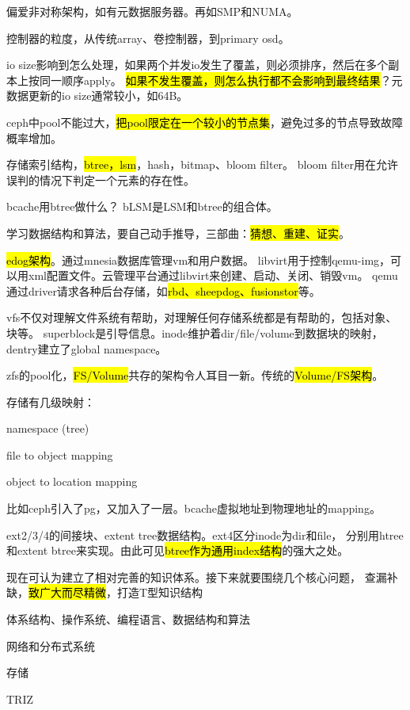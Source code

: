 偏爱非对称架构，如有元数据服务器。再如SMP和NUMA。

控制器的粒度，从传统array、卷控制器，到primary osd。

io size影响到怎么处理，如果两个并发io发生了覆盖，则必须排序，然后在多个副本上按同一顺序apply。
\hl{如果不发生覆盖，则怎么执行都不会影响到最终结果}？元数据更新的io size通常较小，如64B。

ceph中pool不能过大，\hl{把pool限定在一个较小的节点集}，避免过多的节点导致故障概率增加。

存储索引结构，\hl{btree，lsm}，hash，bitmap、bloom filter。
bloom filter用在允许误判的情况下判定一个元素的存在性。

bcache用btree做什么？
bLSM是LSM和btree的组合体。

学习数据结构和算法，要自己动手推导，三部曲：\hl{猜想、重建、证实}。

\hrulefill

\hl{edog架构}。通过mnesia数据库管理vm和用户数据。
libvirt用于控制qemu-img，可以用xml配置文件。云管理平台通过libvirt来创建、启动、关闭、销毁vm。
qemu通过driver请求各种后台存储，如\hl{rbd、sheepdog、fusionstor}等。

\hrulefill

vfs不仅对理解文件系统有帮助，对理解任何存储系统都是有帮助的，包括对象、块等。
superblock是引导信息。inode维护着dir/file/volume到数据块的映射，dentry建立了global namespace。

zfs的pool化，\hl{FS/Volume}共存的架构令人耳目一新。传统的\hl{Volume/FS架构}。

存储有几级映射：
\begin{enumbox}
\item namespace (tree)
\item file to object mapping
\item object to location mapping
\end{enumbox}

比如ceph引入了pg，又加入了一层。bcache虚拟地址到物理地址的mapping。

ext2/3/4的间接块、extent tree数据结构。ext4区分inode为dir和file，
分别用htree和extent btree来实现。由此可见\hl{btree作为通用index结构}的强大之处。

\hrulefill

现在可认为建立了相对完善的知识体系。接下来就要围绕几个核心问题，
查漏补缺，\hl{致广大而尽精微}，打造T型知识结构
\begin{enumbox}
\item 体系结构、操作系统、编程语言、数据结构和算法
\item 网络和分布式系统
\item 存储
\item TRIZ
\end{enumbox}

